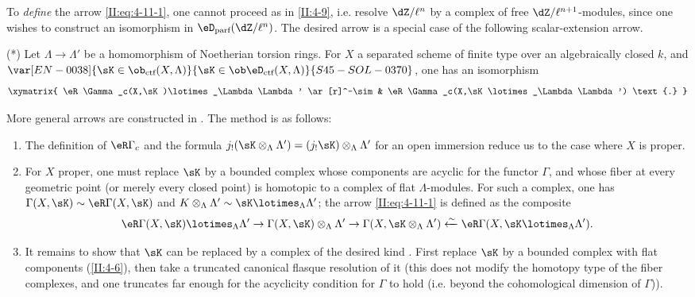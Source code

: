 To \emph{define} the arrow \eqref{II:eq:4-11-1}, one cannot proceed as in
\ref{II:4-9}, i.e. resolve $\dZ/\ell^n$ by a complex of free
$\dZ/\ell^{n+1}$-modules, since one wishes to construct an isomorphism in
$\eD_\text{parf}(\dZ/\ell^n)$. The desired arrow is a special case of the
following scalar-extension arrow.

(*) Let $\Lambda\to\Lambda'$ be a homomorphism of Noetherian torsion rings.
For $X$ a separated scheme of finite type over an algebraically closed $k$,
and $\var[EN-0038]{\sK\in\ob_{\text{ctf}}(X,\Lambda)}{\sK\in\ob\eD_\text{ctf}(X,\Lambda)}{S45-SOL-0370}$, one has an isomorphism
\[\xymatrix{
  \eR\Gamma_c(X,\sK)\lotimes_\Lambda \Lambda' \ar[r]^-\sim & \eR \Gamma_c(X,\sK\lotimes_\Lambda \Lambda') \text{.}
}\]

More general arrows are constructed in . The method
is as follows:
\begin{enumerate}[\indent a)]
  \item {}The definition of $\eR\Gamma_c$ and the formula
    $j_!(\sK\otimes_\Lambda\Lambda') = (j_! \sK)\otimes_\Lambda\Lambda'$ for
    an open immersion reduce us to the case where $X$ is proper.
  \item For $X$ proper, one must replace $\sK$ by a bounded complex whose
    components are acyclic for the functor $\Gamma$, and whose fiber at every
    geometric point (or merely every closed point) is homotopic to a complex
    of flat $\Lambda$-modules. For such a complex, one has
    $\Gamma(X,\sK)\sim \eR\Gamma(X,\sK)$ and
    $K\otimes_\Lambda\Lambda'\sim \sK\lotimes_\Lambda\Lambda'$; the arrow
    \eqref{II:eq:4-11-1} is defined as the composite
    \[
      \eR\Gamma(X,\sK)\lotimes_\Lambda \Lambda' \to \Gamma(X,\sK)\otimes_\Lambda\Lambda' \to \Gamma(X,\sK\otimes_\Lambda\Lambda') \xleftarrow\sim \eR\Gamma(X,\sK\lotimes_\Lambda\Lambda') \text{.}
    \]
  \item It remains to show that $\sK$ can be replaced by a complex of the
    desired kind . First replace $\sK$ by a bounded
    complex with flat components (\ref{II:4-6}), then take a truncated
    canonical flasque resolution of it (this does not modify the homotopy
    type of the fiber complexes, and one truncates far enough for the
    acyclicity condition for $\Gamma$ to hold (i.e. beyond the cohomological
    dimension of $\Gamma$)).
\end{enumerate}







